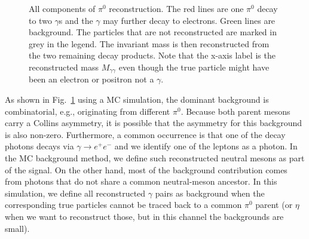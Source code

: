 \begin{figure}[t]
  \centering     
  \caption[Monte Carlo decomposition of the invariant-mass distribution around the \(\pi^{0}\) mass]{All components of $\pi^0$ reconstruction. The red lines are one $\pi^0$ decay to two $\gamma$s and the $\gamma$ may further decay to electrons. Green lines are background. The particles that are not reconstructed are marked in grey in the legend. The invariant mass is then reconstructed from the two remaining decay products. Note that the x-axis label is the reconstructed mass $M_{\gamma\gamma}$ even though the true particle might have been an electron or positron not a $\gamma$.}
  \label{fig:pi0_component}
\end{figure}

As shown in Fig.~\ref{fig:pi0_component} using a MC simulation, the dominant background is combinatorial, e.g., originating from different $\pi^0$. Because both parent mesons carry a Collins asymmetry, it is possible that the asymmetry for this background is also non-zero. Furthermore, a common occurrence is that one of the decay photons decays via $\gamma \rightarrow e^+e^-$ and we identify one of the leptons as a photon. In the MC background method, we define such reconstructed neutral mesons as part of the signal. On the other hand, most of the background contribution comes from photons that do not share a common neutral-meson ancestor. In this simulation, we define all reconstructed $\gamma$ pairs as background when the corresponding true particles cannot be traced back to a common $\pi^0$ parent (or $\eta$ when we want to reconstruct those, but in this channel the backgrounds are small). 



